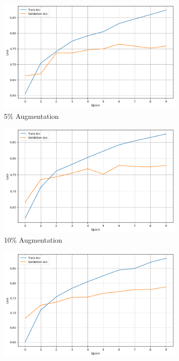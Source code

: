 \documentclass{article}
\begin{document}
\begin{figure}[ht]
  \centering
  \begin{subfigure}[b]{0.3\textwidth}
    \includegraphics[width=\textwidth]{img/random_5.png}
    \caption{5\% Augmentation}
    \label{fig:random_5}
  \end{subfigure}
  \hfill
  \begin{subfigure}[b]{0.3\textwidth}
    \includegraphics[width=\textwidth]{img/random_10.png}
    \caption{10\% Augmentation}
    \label{fig:random_10}
  \end{subfigure}
  \hfill
  \begin{subfigure}[b]{0.3\textwidth}
    \includegraphics[width=\textwidth]{img/random_20.png}

\end{subfigure}
\end{figure}
\end{document}
